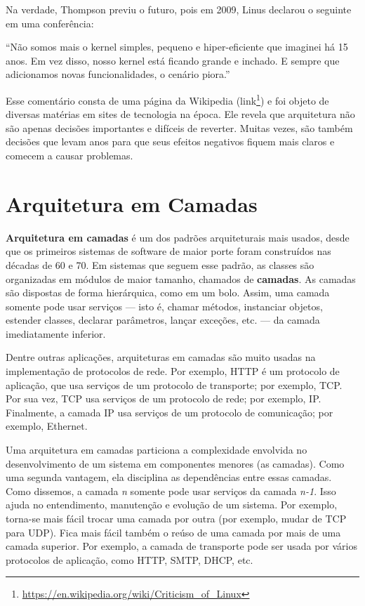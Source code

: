 \documentclass[
  11pt,
  twoside]{book}
\DeclareRobustCommand{\href}[2]{#2\footnote{\url{#1}}}
\renewenvironment{quote}{\centering \vspace{1.5ex} \begin{tcolorbox}[colback=backcolor, width=4.9in]}{\end{tcolorbox}}
\begin{document}
Na verdade, Thompson previu o futuro, pois em 2009, Linus declarou o
seguinte em uma conferência:

\begin{quote}
``Não somos mais o kernel simples, pequeno e hiper-eficiente que
imaginei há 15 anos. Em vez disso, nosso kernel está ficando grande e
inchado. E sempre que adicionamos novas funcionalidades, o cenário
piora.''
\end{quote}

Esse comentário consta de uma página da Wikipedia
(\href{https://en.wikipedia.org/wiki/Criticism_of_Linux}{link}) e foi
objeto de diversas matérias em sites de tecnologia na época. Ele revela
que arquitetura não são apenas decisões importantes e difíceis de
reverter. Muitas vezes, são também decisões que levam anos para que seus
efeitos negativos fiquem mais claros e comecem a causar problemas.

\hypertarget{arquitetura-em-camadas}{%
\section{Arquitetura em Camadas}\label{arquitetura-em-camadas}}


\textbf{Arquitetura em camadas} é um dos padrões arquiteturais mais
usados, desde que os primeiros sistemas de software de maior porte foram
construídos nas décadas de 60 e 70. Em sistemas que seguem esse padrão,
as classes são organizadas em módulos de maior tamanho, chamados de
\textbf{camadas}. As camadas são dispostas de forma hierárquica, como em
um bolo. Assim, uma camada somente pode usar serviços --- isto é, chamar
métodos, instanciar objetos, estender classes, declarar parâmetros,
lançar exceções, etc. --- da camada imediatamente inferior.

Dentre outras aplicações, arquiteturas em camadas são muito usadas na
implementação de protocolos de rede. Por exemplo, HTTP é um protocolo de
aplicação, que usa serviços de um protocolo de transporte; por exemplo,
TCP. Por sua vez, TCP usa serviços de um protocolo de rede; por exemplo,
IP. Finalmente, a camada IP usa serviços de um protocolo de comunicação;
por exemplo, Ethernet.

Uma arquitetura em camadas particiona a complexidade envolvida no
desenvolvimento de um sistema em componentes menores (as camadas). Como
uma segunda vantagem, ela disciplina as dependências entre essas
camadas. Como dissemos, a camada \emph{n} somente pode usar serviços da
camada \emph{n-1}. Isso ajuda no entendimento, manutenção e evolução de
um sistema. Por exemplo, torna-se mais fácil trocar uma camada por outra
(por exemplo, mudar de TCP para UDP). Fica mais fácil também o reúso de
uma camada por mais de uma camada superior. Por exemplo, a camada de
transporte pode ser usada por vários protocolos de aplicação, como HTTP,
SMTP, DHCP, etc.
\end{document}
